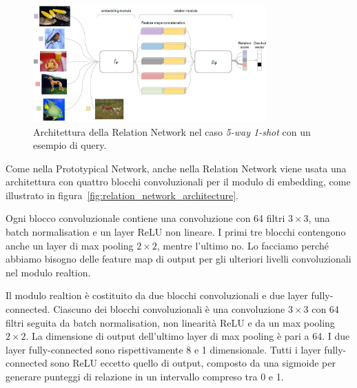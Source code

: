 \documentclass[12pt,a4paper,titlepage]{article}
\begin{document}
\begin{figure}[h]
	\centering	
	\includegraphics[width=0.8\textwidth]{Immagini/relation_network}
	\caption{Architettura della Relation Network nel caso \textit{5-way 1-shot} con un esempio di query.~\cite{DBLP:journals/corr/abs-1711-06025}}
	\label{fig:relation_network}
\end{figure}

Come nella Prototypical Network, anche nella Relation Network viene usata una architettura con quattro blocchi convoluzionali per il modulo di embedding, come illustrato in figura~\ref{fig:relation_network_architecture}.

Ogni blocco convoluzionale contiene una convoluzione con 64 filtri $3 \times 3$, una batch normalisation e un layer ReLU non lineare. I primi tre blocchi contengono anche un layer di max pooling $2 \times 2$, mentre l'ultimo no. Lo facciamo perché abbiamo bisogno delle feature map di output per gli ulteriori livelli convoluzionali nel modulo realtion. 

Il modulo realtion è costituito da due blocchi convoluzionali e due layer fully-connected. Ciascuno dei blocchi convoluzionali è una convoluzione $3 \times 3$ con 64 filtri seguita da batch normalisation, non linearità ReLU e da un max pooling $2 \times 2$. La dimensione di output dell'ultimo layer di max pooling è pari a 64. I due layer fully-connected sono rispettivamente 8 e 1 dimensionale. Tutti i layer fully-connected sono ReLU eccetto quello di output, composto da una sigmoide per generare punteggi di relazione in un intervallo compreso tra 0 e 1.
\end{document}
